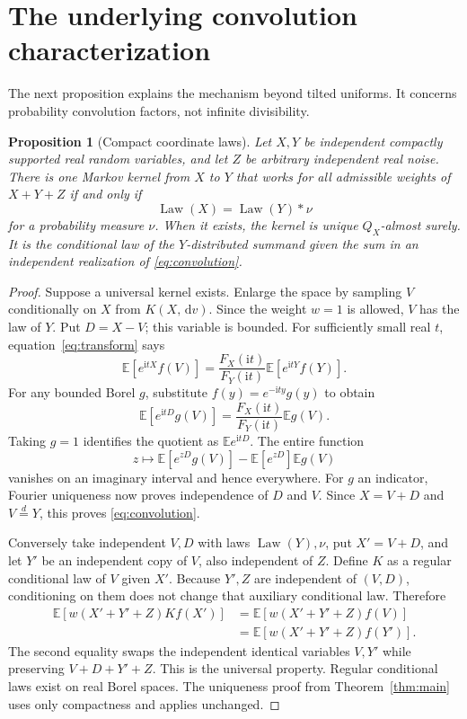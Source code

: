 \documentclass[11pt,a4paper]{article}
\newtheorem{proposition}[theorem]{Proposition}
\theoremstyle{remark}\newtheorem*{ednote}{Editorial note (ProveIt, 2026-10-01)}
\newcommand{\E}{\mathbb E}\newcommand{\R}{\mathbb R}\newcommand{\C}{\mathbb C}\newcommand{\N}{\mathbb N}
\newcommand{\Law}{\operatorname{Law}}\newcommand{\ind}{\mathbf1}
\newcommand{\dd}{\,\mathrm d}\newcommand{\ii}{\mathrm i}
\begin{document}
\section{The underlying convolution characterization}
The next proposition explains the mechanism beyond tilted uniforms. It concerns probability convolution factors, not infinite divisibility.

\begin{proposition}[Compact coordinate laws]\label{prop:convolution}
Let $X,Y$ be independent compactly supported real random variables, and let $Z$ be arbitrary independent real noise. There is one Markov kernel from $X$ to $Y$ that works for all admissible weights of $X+Y+Z$ if and only if
\begin{equation}\label{eq:convolution}
 \Law(X)=\Law(Y)*\nu
\end{equation}
for a probability measure $\nu$. When it exists, the kernel is unique $Q_X$-almost surely. It is the conditional law of the $Y$-distributed summand given the sum in an independent realization of \eqref{eq:convolution}.
\end{proposition}
\begin{proof}
Suppose a universal kernel exists. Enlarge the space by sampling $V$ conditionally on $X$ from $K(X,\dd v)$. Since the weight $w=1$ is allowed, $V$ has the law of $Y$. Put $D=X-V$; this variable is bounded. For sufficiently small real $t$, equation~\eqref{eq:transform} says
\[
 \E[e^{\ii tX}f(V)]
 =\frac{F_X(\ii t)}{F_Y(\ii t)}\E[e^{\ii tY}f(Y)].
\]
For any bounded Borel $g$, substitute $f(y)=e^{-\ii ty}g(y)$ to obtain
\[
 \E[e^{\ii tD}g(V)]
 =\frac{F_X(\ii t)}{F_Y(\ii t)}\E g(V).
\]
Taking $g=1$ identifies the quotient as $\E e^{\ii tD}$. The entire function
\[
 z\longmapsto\E[e^{zD}g(V)]-\E[e^{zD}]\E g(V)
\]
vanishes on an imaginary interval and hence everywhere. For $g$ an indicator, Fourier uniqueness now proves independence of $D$ and $V$. Since $X=V+D$ and $V\stackrel{d}=Y$, this proves \eqref{eq:convolution}.

Conversely take independent $V,D$ with laws $\Law(Y),\nu$, put $X'=V+D$, and let $Y'$ be an independent copy of $V$, also independent of $Z$. Define $K$ as a regular conditional law of $V$ given $X'$. Because $Y',Z$ are independent of $(V,D)$, conditioning on them does not change that auxiliary conditional law. Therefore
\begin{align*}
 \E[w(X'+Y'+Z)Kf(X')]
 &=\E[w(X'+Y'+Z)f(V)]\\
 &=\E[w(X'+Y'+Z)f(Y')].
\end{align*}
The second equality swaps the independent identical variables $V,Y'$ while preserving $V+D+Y'+Z$. This is the universal property. Regular conditional laws exist on real Borel spaces. The uniqueness proof from Theorem~\ref{thm:main} uses only compactness and applies unchanged.
\end{proof}
\end{document}

